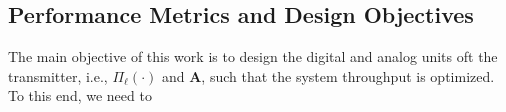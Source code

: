 \documentclass[12pt,draftclsnofoot,onecolumn,journal]{IEEEtran}
\newcommand{\brc}[1]{ \left( #1 \right) }
\begin{document}
%
%
% 
% 
%





\subsection{Performance Metrics and Design Objectives}
The main objective of this work is to design the digital and analog units oft the transmitter, i.e., $\Pi_\ell\brc{\cdot}$ and $\mathbf{A}$, such that the system throughput is optimized. To this end, we need to 
\end{document}
